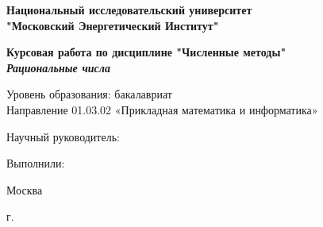 
\begin{titlepage}
\begin{center}

\textbf{Национальный исследовательский университет\\
"Московский Энергетический Институт" } 

\vspace{35mm}

\textbf{\large Курсовая работа по дисциплине "Численные методы"}\\[3mm]
\textbf{\textit{\large Рациональные числа}}

\vspace{20mm}
Уровень образования: бакалавриат\\
Направление 01.03.02 «Прикладная математика и информатика»\\[25mm]


\begin{flushright}
\begin{minipage}[t]{0.4\textwidth}
{Научный руководитель:} \\

\vspace{10mm}

{Выполнили:} \\
\end{minipage}
\end{flushright}

\vfill 

{Москва}
\par{\the\year{} г.}
\end{center}
\end{titlepage}
\restoregeometry
\addtocounter{page}{1}

